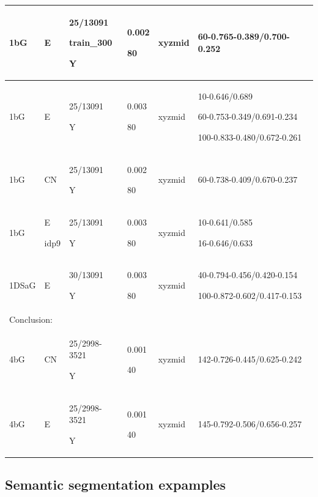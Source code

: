 \documentclass{article}
\begin{document}
\begin{center}
\begin{tabular}{|p{1cm} |p{1cm} |p{1.5cm} | p{2cm} | p{2cm} || p{5cm}|}
		
		\hline\hline
		1bG & E & 25/13091\par train\_300\par Y & 0.002\par 80 & xyzmid & 60-0.765-0.389/0.700-0.252\\ \hline
		1bG & E & 25/13091\par Y & 0.003\par 80 & xyzmid & 10-0.646/0.689 \par 60-0.753-0.349/0.691-0.234 \par  100-0.833-0.480/0.672-0.261\\ \hline
		1bG & CN & 25/13091\par Y & 0.002\par 80 & xyzmid & 60-0.738-0.409/0.670-0.237\\ \hline
		1bG & E \par idp9 & 25/13091\par Y & 0.003\par 80 & xyzmid & 10-0.641/0.585 \par 16-0.646/0.633\\ \hline
		1DSaG & E & 30/13091\par Y & 0.003\par 80 & xyzmid & 40-0.794-0.456/0.420-0.154 \par 100-0.872-0.602/0.417-0.153\\ \hline
		
		\multicolumn{6}{|p{12.5cm}|}{ Conclusion:\par		 }  \\
		
		\hline\hline
		4bG & CN & 25/2998-3521\par Y & 0.001\par 40 & xyzmid & 142-0.726-0.445/0.625-0.242\\
		\hline
		4bG & E & 25/2998-3521\par Y & 0.001\par 40 & xyzmid & 145-0.792-0.506/0.656-0.257\\
		\hline
	\end{tabular}
\end{center}


\subsection{Semantic segmentation expamples}
\end{document}
